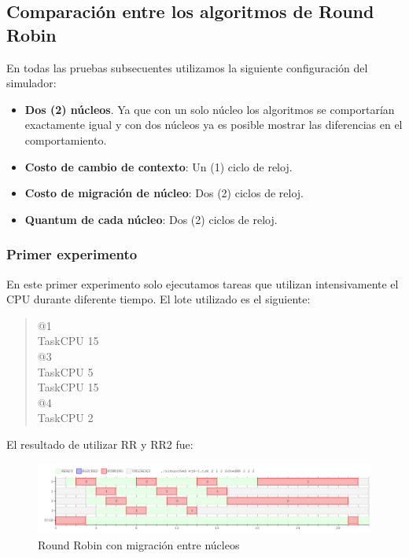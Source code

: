 \subsection{Comparación entre los algoritmos de Round Robin}

En todas las pruebas subsecuentes utilizamos la siguiente configuración del simulador:
\begin{itemize}
	\item \textbf{Dos (2) núcleos}. Ya que con un solo núcleo los algoritmos se comportarían exactamente igual y con dos núcleos ya es posible mostrar las diferencias en el comportamiento.
	\item \textbf{Costo de cambio de contexto}: Un (1) ciclo de reloj.
	\item \textbf{Costo de migración de núcleo}: Dos (2) ciclos de reloj.
	\item \textbf{Quantum de cada núcleo}: Dos (2) ciclos de reloj.
\end{itemize}

\subsubsection{Primer experimento}

En este primer experimento solo ejecutamos tareas que utilizan intensivamente el CPU durante diferente tiempo. El lote utilizado es el siguiente:

\begin{quote}
@1\\
TaskCPU 15\\
@3\\
TaskCPU 5\\
TaskCPU 15\\
@4\\
TaskCPU 2
\end{quote}

El resultado de utilizar RR y RR2 fue:

\begin{figure}[H]
\begin{center}
\includegraphics[width=1.1\textwidth]{img/ej8-1-RR.png}
     \caption{Round Robin con migración entre núcleos}
\end{center}
\end{figure}

